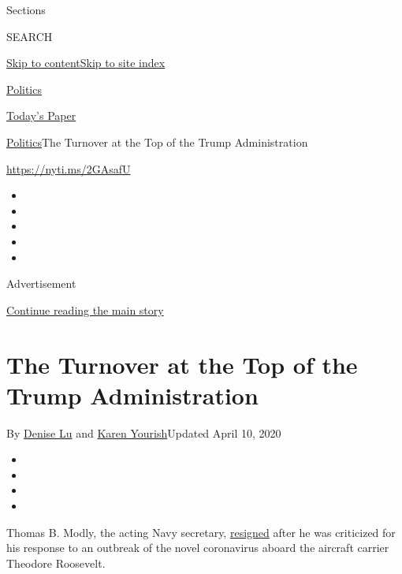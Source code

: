 Sections

SEARCH

\protect\hyperlink{site-content}{Skip to
content}\protect\hyperlink{site-index}{Skip to site index}

\href{https://www.nytimes3xbfgragh.onion/section/politics}{Politics}

\href{https://myaccount.nytimes3xbfgragh.onion/auth/login?response_type=cookie\&client_id=vi}{}

\href{https://www.nytimes3xbfgragh.onion/section/todayspaper}{Today's
Paper}

\href{/section/politics}{Politics}\textbar{}The Turnover at the Top of
the Trump Administration

\url{https://nyti.ms/2GAsafU}

\begin{itemize}
\item
\item
\item
\item
\item
\end{itemize}

Advertisement

\protect\hyperlink{after-top}{Continue reading the main story}

\hypertarget{the-turnover-at-the-top-of-the-trump-administration}{%
\section{The Turnover at the Top of the Trump
Administration}\label{the-turnover-at-the-top-of-the-trump-administration}}

By \href{https://www.nytimes3xbfgragh.onion/by/denise-lu}{Denise Lu} and
\href{https://www.nytimes3xbfgragh.onion/by/karen-yourish}{Karen
Yourish}Updated April 10, 2020

\begin{itemize}
\item
\item
\item
\item
\end{itemize}

Thomas B. Modly, the acting Navy secretary,
\href{https://www.nytimes3xbfgragh.onion/2020/04/07/us/politics/coronavirus-navy-captain-firing.html}{resigned}
after he was criticized for his response to an outbreak of the novel
coronavirus aboard the aircraft carrier Theodore Roosevelt.


